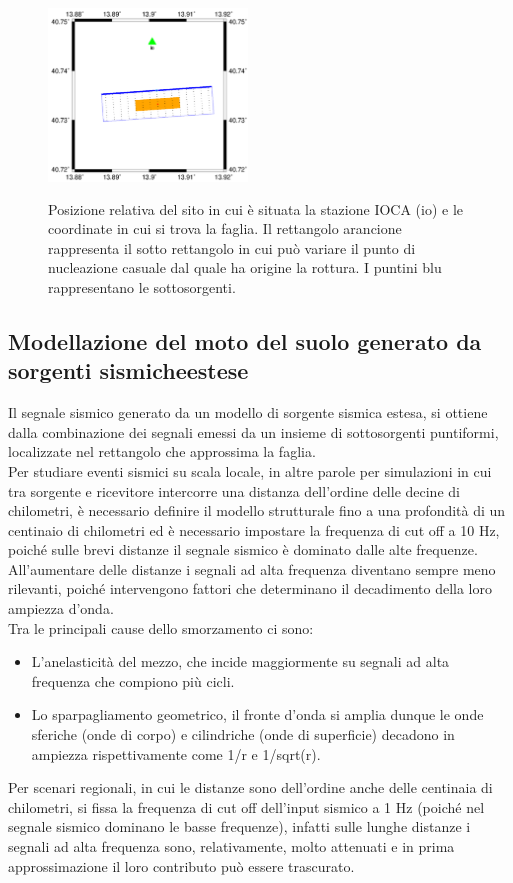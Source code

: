 \documentclass[a4paper,12pt,titlepage]{article}
\begin{document}
\begin{figure}[htbp]%
 \centering
 \includegraphics[width = 150pt, height =150pt]{Img/Positions.png}
 \caption{Posizione relativa del sito in cui è situata la stazione IOCA (io) e le coordinate in cui si trova la faglia. Il rettangolo arancione rappresenta il sotto rettangolo in cui può variare il punto di nucleazione casuale dal quale ha origine la rottura. I puntini blu rappresentano le sottosorgenti.}
 \label{fig:Positions}
\end{figure}
\clearpage

\subsection{Modellazione del moto del suolo generato da sorgenti sismicheestese}
Il segnale sismico generato da un modello di sorgente sismica estesa, si ottiene dalla combinazione dei segnali emessi da un insieme di sottosorgenti puntiformi, localizzate nel rettangolo che approssima la faglia.\\
Per studiare eventi sismici su scala locale, in altre parole per simulazioni in cui tra sorgente e ricevitore intercorre una distanza dell'ordine delle decine di chilometri, è necessario definire il modello strutturale fino a una profondità di un centinaio di chilometri ed è necessario impostare la frequenza di cut off a 10 Hz, poiché sulle brevi distanze il segnale sismico è dominato dalle alte frequenze.\\
All'aumentare delle distanze i segnali ad alta frequenza diventano sempre meno rilevanti, poiché intervengono fattori che determinano il decadimento della loro ampiezza d'onda.\\
Tra le principali cause dello smorzamento ci sono:\\

\begin{itemize}
\item  L'anelasticità del mezzo, che incide maggiormente su segnali ad alta frequenza che compiono più cicli.
\item Lo sparpagliamento geometrico, il fronte d'onda si amplia dunque le onde sferiche (onde di corpo) e cilindriche (onde di superficie) decadono in ampiezza rispettivamente come 1/r e 1/sqrt(r).
\end{itemize}
%
Per scenari regionali, in cui le distanze sono dell'ordine anche delle centinaia di chilometri, si fissa la frequenza di cut off dell'input sismico a 1 Hz (poiché nel segnale sismico dominano le basse frequenze), infatti sulle lunghe distanze i segnali ad alta frequenza sono, relativamente, molto attenuati e in prima approssimazione il loro contributo può essere trascurato.
\clearpage
\end{document}
